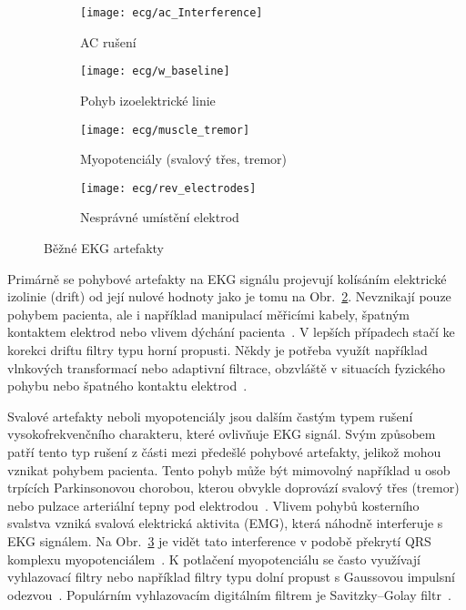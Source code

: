 \begin{figure}[h]
	\begin{subfigure}[b]{0.5\linewidth}
		\centering
		\texttt{[image: ecg/ac\_Interference]}
		\caption{AC rušení}
		\label{fig:ac_Interference}
		\vspace{4ex}
	\end{subfigure}
	\begin{subfigure}[b]{0.5\linewidth}
		\centering
		\texttt{[image: ecg/w\_baseline]}
		\caption{Pohyb izoelektrické linie}
		\label{fig:w_baseline}
		\vspace{4ex}
	\end{subfigure}
	\begin{subfigure}[b]{0.5\linewidth}
		\centering
		\texttt{[image: ecg/muscle\_tremor]}
		\caption{Myopotenciály (svalový třes, tremor)}
		\label{fig:muscle_tremor}
	\end{subfigure}
	\begin{subfigure}[b]{0.5\linewidth}
		\centering
		\texttt{[image: ecg/rev\_electrodes]}
		\caption{Nesprávné umístění elektrod}
		\label{fig:rev_electrodes}
	\end{subfigure}
	\caption{Běžné EKG artefakty~\cite{Mauvila2004}}
	\label{fig:common_artifacts}
\end{figure}

Primárně se pohybové artefakty na EKG signálu projevují kolísáním elektrické
izolinie (drift) od její nulové hodnoty jako je tomu na
Obr.~\ref{fig:w_baseline}. Nevznikají pouze pohybem pacienta, ale i
například manipulací měřicími kabely, špatným kontaktem elektrod nebo vlivem
dýchání pacienta~\cite{Goldberger2017}. V lepších případech stačí ke korekci
driftu filtry typu horní propusti. Někdy je potřeba využít například
vlnkových transformací nebo adaptivní filtrace, obzvláště v situacích fyzického
pohybu nebo špatného kontaktu elektrod~\cite{Kher2019}.

Svalové artefakty neboli myopotenciály jsou dalším častým typem rušení
vysokofrekvenčního charakteru, které ovlivňuje EKG signál. Svým způsobem patří
tento typ rušení z části mezi předešlé pohybové artefakty, jelikož mohou vznikat
pohybem pacienta. Tento pohyb může být mimovolný například u osob trpících
Parkinsonovou chorobou, kterou obvykle doprovází svalový třes (tremor) nebo
pulzace arteriální tepny pod elektrodou~\cite{Surawicz2008}. Vlivem pohybů
kosterního svalstva vzniká svalová elektrická aktivita (EMG), která náhodně
interferuje s EKG signálem. Na Obr.~\ref{fig:muscle_tremor} je vidět tato
interference v podobě překrytí QRS komplexu
myopotenciálem~\cite{Goldberger2017}. K potlačení myopotenciálu se často
využívají vyhlazovací filtry nebo například filtry typu dolní propust s
Gaussovou impulsní odezvou~\cite{Kher2019}. Populárním vyhlazovacím digitálním
filtrem je Savitzky–Golay filtr~\cite{Schafer2011}.

